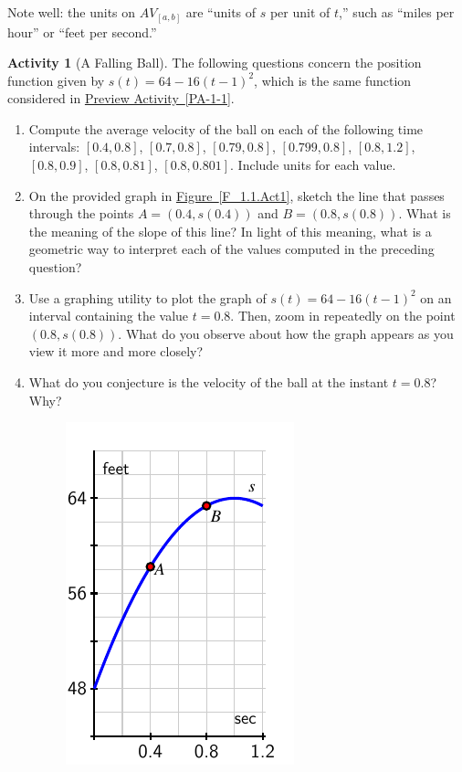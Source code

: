 \documentclass[10pt,]{book}
\theoremstyle{plain}
\theoremstyle{definition}
\theoremstyle{definition}
\theoremstyle{definition}
\theoremstyle{definition}
\newtheorem{activity}[project]{Activity}
\theoremstyle{definition}
\numberwithin{equation}{section}
\begin{document}
Note well: the units on \(AV_{[a,b]}\) are
``units of \(s\) per unit of \(t\),'' such as ``miles per hour'' or ``feet per second.''
%
\begin{activity}[A Falling Ball]\label{act-1-1-1}
The following questions concern the position function given by \(s(t) = 64 - 16(t-1)^2\), which is the same function considered in \hyperref[PA-1-1]{Preview Activity~\ref{PA-1-1}}.%
\leavevmode%
\begin{enumerate}[label=\alph*]
\item\hypertarget{li-8}{}Compute the average velocity of the ball on each of the following time intervals: \([0.4,0.8]\), \([0.7,0.8]\), \([0.79, 0.8]\), \([0.799,0.8]\), \([0.8,1.2]\), \([0.8,0.9]\), \([0.8,0.81]\), \([0.8,0.801]\).  Include units for each value.%
\item\hypertarget{li-9}{}On the provided graph in \hyperref[F_1.1.Act1]{Figure~\ref{F_1.1.Act1}}, sketch the line that passes through the points \(A=(0.4, s(0.4))\) and \(B=(0.8, s(0.8))\).  What is the meaning of the slope of this line?  In light of this meaning, what is a geometric way to interpret each of the values computed in the preceding question?%
\item\hypertarget{li-10}{}Use a graphing utility to plot the graph of \(s(t) = 64 - 16(t-1)^2\) on an interval containing the value \(t = 0.8\).  Then, zoom in repeatedly on the point \((0.8, s(0.8))\).  What do you observe about how the graph appears as you view it more and more closely?%
\item\hypertarget{li-11}{}What do you conjecture is the velocity of the ball at the instant \(t = 0.8\)?  Why?%
\leavevmode%
\begin{figure}
\centering
\includegraphics[width=0.5\linewidth]{images/1_1_Act1}

\end{figure}
\end{enumerate}
\end{activity}
\end{document}
